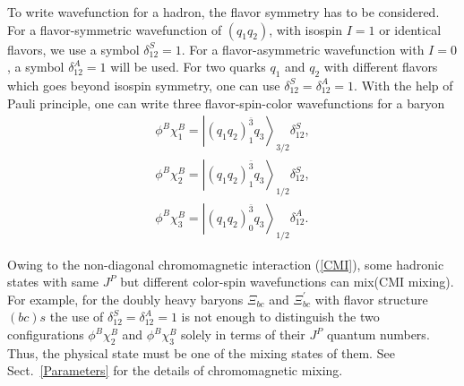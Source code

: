 \documentclass[prd,twocolumn,floatfix,nofootinbib]{revtex4}
\begin{document}
To write wavefunction for a hadron, the flavor symmetry has to be
considered. For a flavor-symmetric wavefunction of $\left( q_{1}q_{2}\right)
$, with isospin $I=1$ or identical flavors, we use a symbol $\delta
_{12}^{S}=1$. For a flavor-asymmetric wavefunction with $I=0$, a symbol $%
\delta _{12}^{A}=1$ will be used. For two quarks $q_{1}$ and $q_{2}$ with
different flavors which goes beyond isospin symmetry, one can use $\delta
_{12}^{S}=\delta _{12}^{A}=1$. With the help of Pauli principle, one can
write three flavor-spin-color wavefunctions for a baryon
\begin{equation}
\begin{aligned} \phi^{B}\chi_{1}^{B}={\left|
{\left(q_{1}q_{2}\right)}_{1}^{\bar{3}} q_{3} \right\rangle}_{3/2}
\delta_{12}^{S}, \\ \phi^{B}\chi_{2}^{B}={\left|
{\left(q_{1}q_{2}\right)}_{1}^{\bar{3}} q_{3} \right\rangle}_{1/2}
\delta_{12}^{S}, \\ \phi^{B}\chi_{3}^{B}={\left|
{\left(q_{1}q_{2}\right)}_{0}^{\bar{3}} q_{3} \right\rangle}_{1/2}
\delta_{12}^{A}. \end{aligned}  \label{colorspinB}
\end{equation}

Owing to the non-diagonal chromomagnetic interaction (\ref{CMI}), some
hadronic states with same $J^{P}$ but different color-spin wavefunctions can
mix(CMI mixing). For example, for the doubly heavy baryons $\Xi _{bc}$ and $%
\Xi _{bc}^{\prime }$ with flavor structure $(bc)s$ the use of $\delta
_{12}^{S}=\delta _{12}^{A}=1$ is not enough to distinguish the two
configurations $\phi ^{B}\chi _{2}^{B}$ and $\phi ^{B}\chi _{3}^{B}$ solely
in terms of their $J^{P}$ quantum numbers. Thus, the physical state must be
one of the mixing states of them. See Sect.~\ref{Parameters} for the details
of chromomagnetic mixing.
\end{document}
